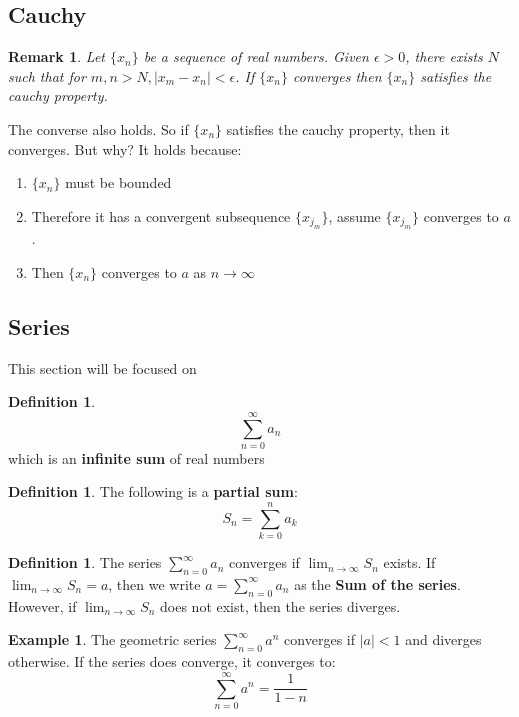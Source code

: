 \documentclass[12pt]{article}
\theoremstyle{plain}
\newtheorem*{remark}{Remark}
\theoremstyle{definition}
\newtheorem{definition}[theorem]{Definition}
\newtheorem{example}[theorem]{Example}
\begin{document}
\subsection{Cauchy}

\begin{remark}
	Let $\{ x_n \}$ be a sequence of real numbers. Given $\epsilon > 0$, there exists $N$ such that for $m,n > N, |x_m- x_n|<\epsilon$. If $\{ x_n \}$ converges then $\{ x_n \}$ satisfies the cauchy property.

\end{remark}

The converse also holds. So if $\{ x_n \}$ satisfies the cauchy property, then it converges. But why? It holds because:
\begin{enumerate}
	\item $\{ x_n \}$ must be bounded
	\item Therefore it has a convergent subsequence $\{ x_{j_m} \}$, assume  $\{ x_{j_m} \}$ converges to $a$.
	\item Then $\{ x_n \}$ converges to $a$ as $n\to\infty$
\end{enumerate}

\subsection{Series}

This section will be focused on 
\begin{definition}
$$\sum^\infty_{n=0} a_n$$ which is an \textbf{infinite sum} of real numbers
\end{definition}

\begin{definition}
	The following is a \textbf{partial sum}:
	$$S_n = \sum^n_{k=0} a_k$$
\end{definition}

\begin{definition}
	The series $\sum^\infty_{n=0} a_n$ converges if $\lim_{n\to\infty} S_n$ exists. If $\lim_{n\to\infty} S_n = a$, then we write $a = \sum^\infty_{n=0} a_n$  as the \textbf{Sum of the series}. However, if $\lim_{n\to\infty} S_n$ does not exist, then the series diverges.
\end{definition}

\begin{example}
	The geometric series $\sum^\infty_{n=0} a^n$ converges if $|a|<1$ and diverges otherwise. If the series does converge, it converges to:
	$$\sum^\infty_{n=0} a^n = \frac{1}{1-n}$$
\end{example}
\end{document}

